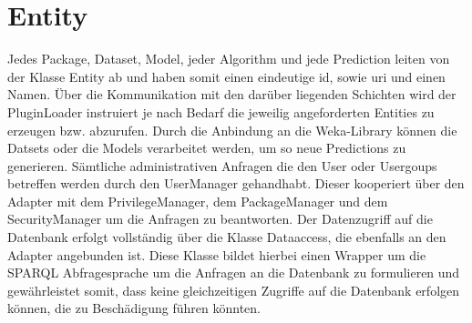 \section{Entity}


Jedes Package, Dataset, Model, jeder Algorithm und jede Prediction leiten von der Klasse Entity ab und haben somit einen eindeutige id, sowie uri und einen Namen. Über die Kommunikation mit den darüber liegenden Schichten wird der PluginLoader instruiert je nach Bedarf die jeweilig angeforderten Entities zu erzeugen bzw. abzurufen. Durch die Anbindung an die Weka-Library können die Datsets oder die Models verarbeitet werden, um so neue Predictions zu generieren.
Sämtliche administrativen Anfragen die den User oder Usergoups betreffen werden durch den UserManager gehandhabt. Dieser kooperiert über den Adapter mit dem PrivilegeManager, dem PackageManager und dem SecurityManager um die Anfragen zu beantworten.
Der Datenzugriff auf die Datenbank erfolgt vollständig über die Klasse Dataaccess, die ebenfalls an den Adapter angebunden ist. Diese Klasse bildet hierbei einen Wrapper um die SPARQL Abfragesprache um die Anfragen an die Datenbank zu formulieren und gewährleistet somit, dass keine gleichzeitigen Zugriffe auf die Datenbank erfolgen können, die zu Beschädigung führen könnten.